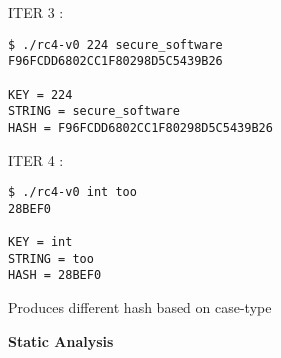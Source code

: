 ITER 3 :

\begin{verbatim}
$ ./rc4-v0 224 secure_software
F96FCDD6802CC1F80298D5C5439B26

KEY = 224
STRING = secure_software
HASH = F96FCDD6802CC1F80298D5C5439B26
\end{verbatim}

ITER 4 :

\begin{verbatim}
$ ./rc4-v0 int too
28BEF0

KEY = int
STRING = too
HASH = 28BEF0
\end{verbatim}

Produces different hash based on case-type

\textbf{Static Analysis}

\begin{Shaded}
\begin{Highlighting}[]
\NormalTok{:}
 
     \NormalTok{(}\NormalTok{) * strlen(argv[}\NormalTok{]));}
\NormalTok{    \textasciitilde{}\textasciitilde{}\textasciitilde{}\textasciitilde{}\textasciitilde{}\textasciitilde{}\textasciitilde{}\textasciitilde{}\textasciitilde{}\textasciitilde{}\textasciitilde{}\textasciitilde{}\textasciitilde{}\textasciitilde{}\textasciitilde{}             \^{}\textasciitilde{}\textasciitilde{}\textasciitilde{}\textasciitilde{}\textasciitilde{} \textasciitilde{}\textasciitilde{}\textasciitilde{}\textasciitilde{}\textasciitilde{}\textasciitilde{}\textasciitilde{}\textasciitilde{}\textasciitilde{}\textasciitilde{}\textasciitilde{}}

\NormalTok{:}
     \NormalTok{;}
\NormalTok{           \^{}}
\end{Highlighting}
\end{Shaded}

